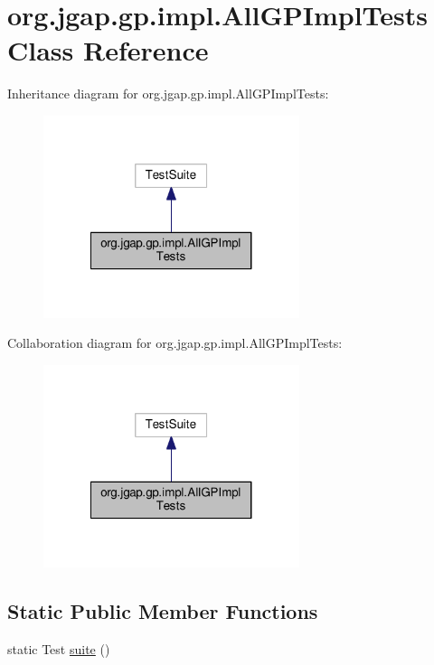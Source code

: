 \hypertarget{classorg_1_1jgap_1_1gp_1_1impl_1_1_all_g_p_impl_tests}{\section{org.\-jgap.\-gp.\-impl.\-All\-G\-P\-Impl\-Tests Class Reference}
\label{classorg_1_1jgap_1_1gp_1_1impl_1_1_all_g_p_impl_tests}
}


Inheritance diagram for org.\-jgap.\-gp.\-impl.\-All\-G\-P\-Impl\-Tests\-:
\nopagebreak
\begin{figure}[H]
\begin{center}
\leavevmode
\includegraphics[width=212pt]{classorg_1_1jgap_1_1gp_1_1impl_1_1_all_g_p_impl_tests__inherit__graph}
\end{center}
\end{figure}


Collaboration diagram for org.\-jgap.\-gp.\-impl.\-All\-G\-P\-Impl\-Tests\-:
\nopagebreak
\begin{figure}[H]
\begin{center}
\leavevmode
\includegraphics[width=212pt]{classorg_1_1jgap_1_1gp_1_1impl_1_1_all_g_p_impl_tests__coll__graph}
\end{center}
\end{figure}
\subsection*{Static Public Member Functions}
\begin{DoxyCompactItemize}
\item 
static Test \hyperlink{classorg_1_1jgap_1_1gp_1_1impl_1_1_all_g_p_impl_tests_a1dc456a80f0c1440ad41a4b09162da4f}{suite} ()
\end{DoxyCompactItemize}
